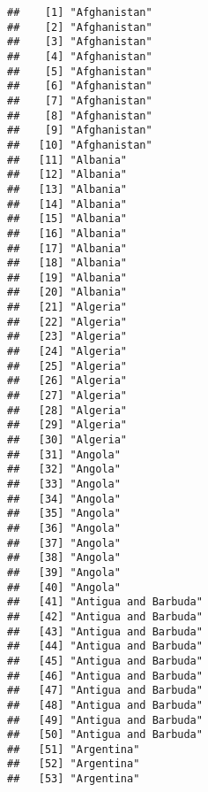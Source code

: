 \documentclass[]{article}
\begin{document}
\begin{verbatim}
##    [1] "Afghanistan"                        
##    [2] "Afghanistan"                        
##    [3] "Afghanistan"                        
##    [4] "Afghanistan"                        
##    [5] "Afghanistan"                        
##    [6] "Afghanistan"                        
##    [7] "Afghanistan"                        
##    [8] "Afghanistan"                        
##    [9] "Afghanistan"                        
##   [10] "Afghanistan"                        
##   [11] "Albania"                            
##   [12] "Albania"                            
##   [13] "Albania"                            
##   [14] "Albania"                            
##   [15] "Albania"                            
##   [16] "Albania"                            
##   [17] "Albania"                            
##   [18] "Albania"                            
##   [19] "Albania"                            
##   [20] "Albania"                            
##   [21] "Algeria"                            
##   [22] "Algeria"                            
##   [23] "Algeria"                            
##   [24] "Algeria"                            
##   [25] "Algeria"                            
##   [26] "Algeria"                            
##   [27] "Algeria"                            
##   [28] "Algeria"                            
##   [29] "Algeria"                            
##   [30] "Algeria"                            
##   [31] "Angola"                             
##   [32] "Angola"                             
##   [33] "Angola"                             
##   [34] "Angola"                             
##   [35] "Angola"                             
##   [36] "Angola"                             
##   [37] "Angola"                             
##   [38] "Angola"                             
##   [39] "Angola"                             
##   [40] "Angola"                             
##   [41] "Antigua and Barbuda"                
##   [42] "Antigua and Barbuda"                
##   [43] "Antigua and Barbuda"                
##   [44] "Antigua and Barbuda"                
##   [45] "Antigua and Barbuda"                
##   [46] "Antigua and Barbuda"                
##   [47] "Antigua and Barbuda"                
##   [48] "Antigua and Barbuda"                
##   [49] "Antigua and Barbuda"                
##   [50] "Antigua and Barbuda"                
##   [51] "Argentina"                          
##   [52] "Argentina"                          
##   [53] "Argentina"                          

\end{verbatim}
\end{document}
